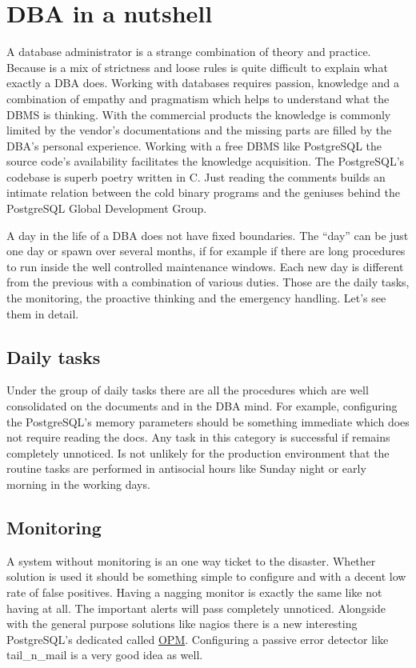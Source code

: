 \chapter{DBA in a nutshell}
A database administrator is a strange combination of theory and practice. Because is a mix of strictness 
and loose rules is quite difficult to explain what exactly a DBA does. Working with databases requires 
passion, knowledge and a combination of empathy and pragmatism which helps to understand what 
the DBMS is thinking. With the commercial products the knowledge is commonly limited by the vendor's 
documentations and the missing parts are filled by the DBA's personal experience. Working with a free DBMS 
like PostgreSQL the source code's availability facilitates the knowledge acquisition. The PostgreSQL's 
codebase is superb poetry written in C. Just reading the comments builds an intimate relation between the 
cold binary programs and the geniuses behind the PostgreSQL Global Development Group.\newline

A day in the life of a DBA does not have fixed boundaries. The ``day'' can be just one day or spawn 
over several months, if for example if there are long procedures to run inside the well controlled 
maintenance windows. Each new day is different from the previous with a combination of various duties. 
Those are the daily tasks, the monitoring, the proactive thinking and the emergency handling. Let's see 
them in detail.

\section{Daily tasks}
Under the group of daily tasks there are all the procedures which are well consolidated on the documents 
and in the DBA mind. For example, configuring the PostgreSQL's memory parameters should be something 
immediate which does not require reading the docs. Any task in this category is successful if remains 
completely unnoticed. Is not unlikely for the production environment that the routine tasks are 
performed in antisocial hours like Sunday night or early morning in the working days.

\section{Monitoring}
A system without monitoring is an one way ticket to the disaster. Whether solution is used it should be 
something simple to configure and with a decent low rate of false positives. Having a nagging monitor is 
exactly the same like not having at all. The important alerts will pass completely unnoticed. Alongside 
with the general purpose solutions like nagios there is a new interesting PostgreSQL's dedicated called 
\href{http://opm.io/}{OPM}. Configuring a passive error detector like tail\_n\_mail is a very good idea as 
well. 

